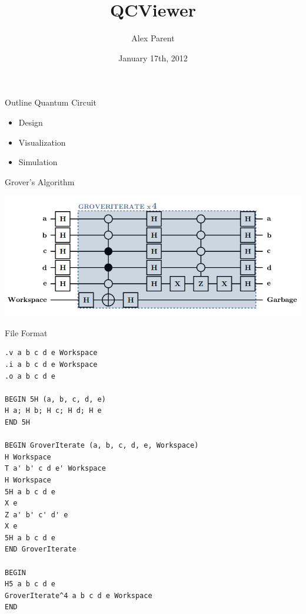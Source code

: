 \documentclass{beamer}
\title{QCViewer}
\author{Alex Parent}
\institute{University of Waterloo, IQC}
\date{January 17th, 2012}
\begin{document}
\begin{frame}
\titlepage
\end{frame}

\begin{frame}{Outline}
Quantum Circuit
\begin{itemize}
\item Design
\item Visualization 
\item Simulation  
\end{itemize}
\end{frame}

\begin{frame}{Grover's Algorithm}
\begin{center}
\includegraphics[scale=0.32]{grover_circuit}
\end{center}
\end{frame}

\begin{frame}[fragile]{File Format}

\begin{center}
\begin{tiny}
\begin{BVerbatim}[boxwidth=auto]
.v a b c d e Workspace
.i a b c d e Workspace
.o a b c d e

BEGIN 5H (a, b, c, d, e)
H a; H b; H c; H d; H e
END 5H

BEGIN GroverIterate (a, b, c, d, e, Workspace)
H Workspace
T a' b' c d e' Workspace
H Workspace
5H a b c d e
X e
Z a' b' c' d' e
X e
5H a b c d e
END GroverIterate

BEGIN
H5 a b c d e
GroverIterate^4 a b c d e Workspace
END
\end{BVerbatim}
\end{tiny}

\end{center}

\end{frame}
\end{document}
